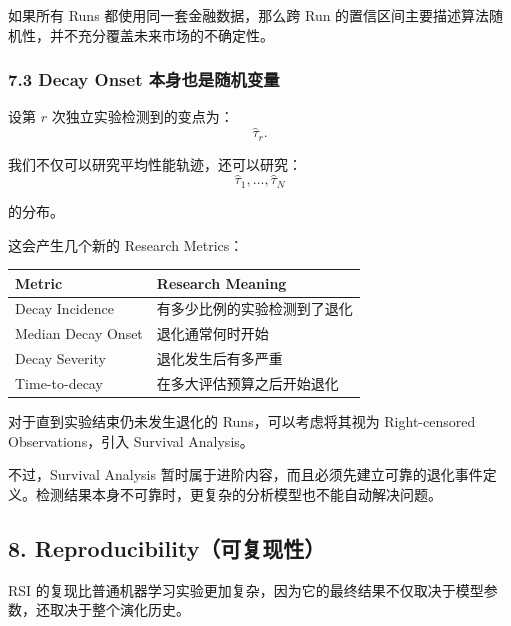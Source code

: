 如果所有 Runs 都使用同一套金融数据，那么跨 Run 的置信区间主要描述算法随机性，并不充分覆盖未来市场的不确定性。

\hypertarget{part-3-48-0001-decay-onset-ux672cux8eabux4e5fux662fux968fux673aux53d8ux91cf}{%
\subsubsection{7.3 Decay Onset 本身也是随机变量}\label{part-3-48-0001-decay-onset-ux672cux8eabux4e5fux662fux968fux673aux53d8ux91cf}}

设第 \(r\) 次独立实验检测到的变点为：
\[\hat\tau_r.\]

我们不仅可以研究平均性能轨迹，还可以研究：
\[\hat\tau_1,\ldots,\hat\tau_N\]

的分布。

这会产生几个新的 Research Metrics：

\begin{readertable}
\begin{longtable}[]{@{}
  >{\raggedright\arraybackslash}p{}
  >{\raggedright\arraybackslash}p{}@{}}
\toprule
Metric & Research Meaning \\
\midrule
\endhead
Decay Incidence & 有多少比例的实验检测到了退化 \\
Median Decay Onset & 退化通常何时开始 \\
Decay Severity & 退化发生后有多严重 \\
Time-to-decay & 在多大评估预算之后开始退化 \\
\bottomrule
\end{longtable}
\end{readertable}

对于直到实验结束仍未发生退化的 Runs，可以考虑将其视为 Right-censored Observations，引入 Survival Analysis。

不过，Survival Analysis 暂时属于进阶内容，而且必须先建立可靠的退化事件定义。检测结果本身不可靠时，更复杂的分析模型也不能自动解决问题。

\hypertarget{part-3-48-0001-reproducibilityux53efux590dux73b0ux6027}{%
\subsection{8. Reproducibility（可复现性）}\label{part-3-48-0001-reproducibilityux53efux590dux73b0ux6027}}

RSI 的复现比普通机器学习实验更加复杂，因为它的最终结果不仅取决于模型参数，还取决于整个演化历史。

